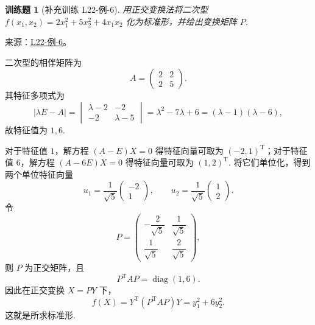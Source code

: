 \documentclass[12pt,fontset=fandol]{ctexart}
\newtheorem{exercise}{训练题}[section]
\begin{document}
\begin{exercise}[补充训练 L22-例-6]\label{prob:L22-例-6}
用正交变换法将二次型 $f(x_1,x_2) = 2x_1^2 + 5x_2^2 + 4x_1x_2$ 化为标准形，并给出变换矩阵 $P$.
\end{exercise}
\noindent 来源：\href{https://github.com/yhwu-is/Linear-Algebra-Left-Undone/blob/new/%E8%AE%B2%E4%B9%89/%E4%B8%93%E9%A2%98/22%20%E4%BA%8C%E6%AC%A1%E5%9E%8B.tex}{L22-例-6}。
\begin{solve}
二次型的相伴矩阵为
    \[
        A=\begin{pmatrix}
            2 & 2 \\
            2 & 5
        \end{pmatrix}.
    \]
    其特征多项式为
    \[
        |\lambda E-A|=\begin{vmatrix}
            \lambda-2 & -2        \\
            -2        & \lambda-5
        \end{vmatrix}
        =\lambda^2-7\lambda+6=(\lambda-1)(\lambda-6),
    \]
    故特征值为 $1,6$.

    对于特征值 $1$，解方程 $(A-E)X=0$ 得特征向量可取为 $(-2,1)^\mathrm{T}$；对于特征值 $6$，解方程 $(A-6E)X=0$ 得特征向量可取为 $(1,2)^\mathrm{T}$. 将它们单位化，得到两个单位特征向量
    \[
        u_1=\frac{1}{\sqrt{5}}\begin{pmatrix}
            -2 \\
            1
        \end{pmatrix},
        \qquad
        u_2=\frac{1}{\sqrt{5}}\begin{pmatrix}
            1 \\
            2
        \end{pmatrix}.
    \]
    令
    \[
        P=\begin{pmatrix}
            -\dfrac{2}{\sqrt{5}} & \dfrac{1}{\sqrt{5}} \\
            \dfrac{1}{\sqrt{5}}  & \dfrac{2}{\sqrt{5}}
        \end{pmatrix},
    \]
    则 $P$ 为正交矩阵，且
    \[
        P^\mathrm{T}AP=\operatorname{diag}(1,6).
    \]
    因此在正交变换 $X=PY$ 下，
    \[
        f(X)=Y^\mathrm{T}(P^\mathrm{T}AP)Y=y_1^2+6y_2^2.
    \]
    这就是所求标准形.
\end{solve}
\end{document}
